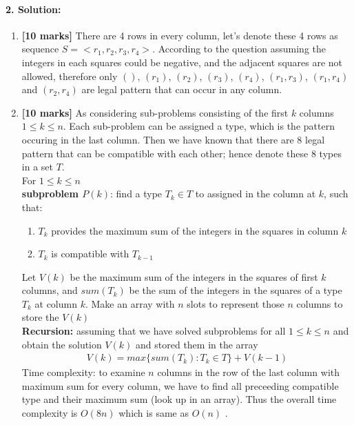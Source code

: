 \documentclass[a4paper]{scrartcl}
\begin{document}
\paragraph{2. Solution:}
\label{sec:Question 2}
\begin{enumerate}[label=(\alph*)]
  \item {\bfseries[10 marks]} There are 4 rows in every column, let's denote these 4 rows as sequence $S=\big<r_1,r_2,r_3,r_4\big>$.
  According to the question assuming the integers in each squares could be negative, and the adjacent squares are not allowed, therefore only $()$, $(r_1)$, $(r_2)$, $(r_3)$, $(r_4)$, $(r_1, r_3)$, $(r_1, r_4)$ and $(r_2, r_4)$ are legal pattern that can occur in any column. \\
  \item {\bfseries[10 marks]} As considering sub-problems consisting of the first $k$ columns $1\leq k \leq n$. Each sub-problem can be assigned a type, which is the pattern occuring in the last column. Then we have known that there are 8 legal pattern that can be compatible with each other; hence denote these 8 types in a set $T$. \\
  For $1\leq k \leq n$\\
  \textbf{subproblem $P(k)$}: find a type $T_k \in T$ to assigned in the column at $k$, such that:
  \begin{enumerate}[label=(\arabic{*})]
    \item $T_k$ provides the maximum sum of the integers in the squares in column $k$
    \item $T_k$ is compatible with $T_{k-1}$
  \end{enumerate}
  Let $V(k)$ be the maximum sum of the integers in the squares of first $k$ columns, and $sum(T_k)$ be the sum of the integers in the squares of a type $T_k$ at column $k$.
  Make an array with $n$ slots to represent those $n$ columns to store the $V(k)$\\
\textbf{Recursion:} assuming that we have solved subproblems for all $1\leq k \leq n$ and obtain the solution $V(k)$ and stored them in the array
\begin{align*}
  V(k)=  max\{ sum(T_k) : T_k \in T \} +V(k-1)
\end{align*}
Time complexity: to examine $n$ columns in the row of the last column with maximum sum for every 
column, we have to find all preceeding compatible type and their maximum sum (look up in an array). Thus the overall time complexity is $O(8n)$ which is same as $O(n)$ .
\end{enumerate}
\end{document}
